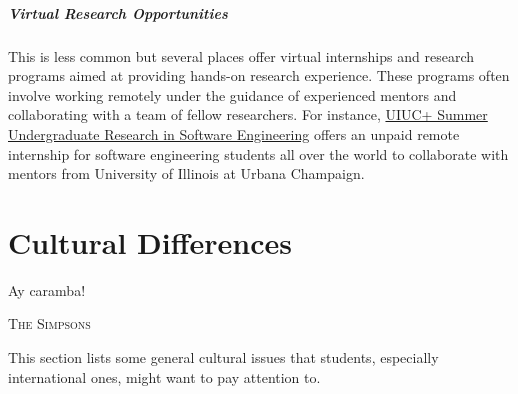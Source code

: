 \documentclass[oneside,11pt,dvipsnames]{book}
\begin{document}
\paragraph{Virtual Research Opportunities} This is less common but several places offer virtual internships and research programs aimed at providing hands-on research experience. These programs often involve working remotely under the guidance of experienced mentors and collaborating with a team of fellow researchers. For instance, \href{https://docs.google.com/forms/d/1btIwt4HwjyKMOUk-EMy3rbkfWzFxv2lNrMm_zkd0pA4/viewform?edit_requested=true}{UIUC+ Summer Undergraduate Research in Software Engineering}  offers an unpaid remote internship for software engineering students all over the world to collaborate with mentors from University of Illinois at Urbana Champaign.




\chapter{Cultural Differences}\label{sec:cultural}

\epigraph{\vspace{-0.2in} Ay caramba!}{\textsc{The Simpsons}}


This section lists some general cultural issues that students, especially international ones, might want to pay attention to.

\end{document}
